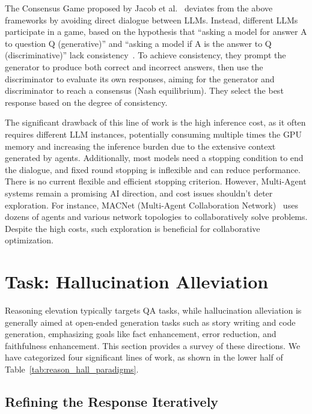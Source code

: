 \documentclass[lettersize,journal]{IEEEtran}
\begin{document}
The Consensus Game proposed by Jacob et al.~\cite{ConsensusGame_24_ICLR_MIT} deviates from the above frameworks by avoiding direct dialogue between LLMs. Instead, different LLMs participate in a game, based on the hypothesis that ``asking a model for answer A to question Q (generative)'' and ``asking a model if A is the answer to Q (discriminative)'' lack consistency~\cite{liang2023uhgeval}. To achieve consistency, they prompt the generator to produce both correct and incorrect answers, then use the discriminator to evaluate its own responses, aiming for the generator and discriminator to reach a consensus (Nash equilibrium). They select the best response based on the degree of consistency.

The significant drawback of this line of work is the high inference cost, as it often requires different LLM instances, potentially consuming multiple times the GPU memory and increasing the inference burden due to the extensive context generated by agents. Additionally, most models need a stopping condition to end the dialogue, and fixed round stopping is inflexible and can reduce performance. There is no current flexible and efficient stopping criterion. However, Multi-Agent systems remain a promising AI direction, and cost issues shouldn't deter exploration. For instance, MACNet (Multi-Agent Collaboration Network)~\cite{MACNet_24_arXiv_THU} uses dozens of agents and various network topologies to collaboratively solve problems. Despite the high costs, such exploration is beneficial for collaborative optimization.


\section{Task: Hallucination Alleviation} \label{sec:hallucination_alleviation}


\noindent Reasoning elevation typically targets QA tasks, while hallucination alleviation is generally aimed at open-ended generation tasks such as story writing and code generation, emphasizing goals like fact enhancement, error reduction, and faithfulness enhancement. This section provides a survey of these directions. We have categorized four significant lines of work, as shown in the lower half of Table~\ref{tab:reason_hall_paradigms}.


\subsection{Refining the Response Iteratively} \label{sec:refining_the_response_iteratively}
\end{document}
